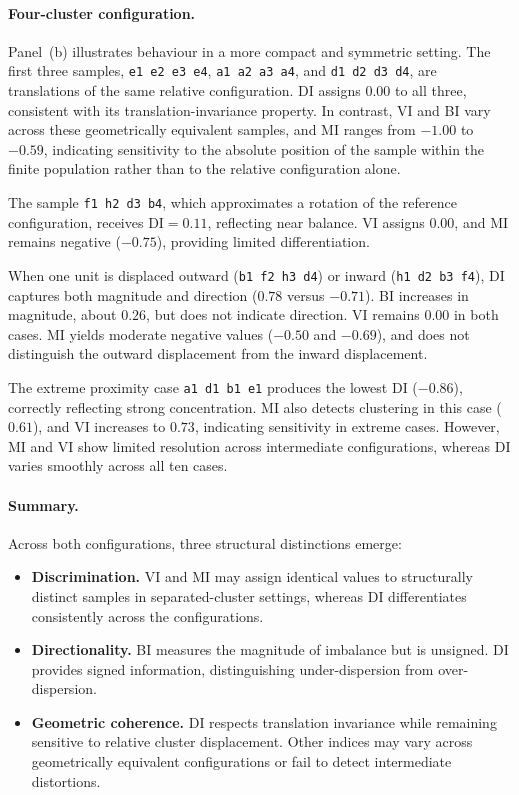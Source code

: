 \documentclass[12pt]{imsart}
\theoremstyle{plain}
\theoremstyle{remark}
\begin{document}
\paragraph{Four-cluster configuration.}

Panel~(b) illustrates behaviour in a more compact and symmetric setting. The
first three samples,
\texttt{e1 e2 e3 e4}, \texttt{a1 a2 a3 a4}, and \texttt{d1 d2 d3 d4},
are translations of the same relative configuration. DI assigns \(0.00\) to
all three, consistent with its translation-invariance property. In contrast,
VI and BI vary across these geometrically equivalent samples, and MI ranges
from \(-1.00\) to \(-0.59\), indicating sensitivity to the absolute position
of the sample within the finite population rather than to the relative
configuration alone.

The sample \texttt{f1 h2 d3 b4}, which approximates a rotation of the
reference configuration, receives \(\mathrm{DI}=0.11\), reflecting near
balance. VI assigns \(0.00\), and MI remains negative (\(-0.75\)), providing
limited differentiation.

When one unit is displaced outward (\texttt{b1 f2 h3 d4}) or inward
(\texttt{h1 d2 b3 f4}), DI captures both magnitude and direction
(\(0.78\) versus \(-0.71\)). BI increases in magnitude, about \(0.26\), but
does not indicate direction. VI remains \(0.00\) in both cases. MI yields
moderate negative values (\(-0.50\) and \(-0.69\)), and does not distinguish
the outward displacement from the inward displacement.

The extreme proximity case \texttt{a1 d1 b1 e1} produces the lowest DI
(\(-0.86\)), correctly reflecting strong concentration. MI also detects
clustering in this case (\(0.61\)), and VI increases to \(0.73\), indicating
sensitivity in extreme cases. However, MI and VI show limited resolution
across intermediate configurations, whereas DI varies smoothly across all ten
cases.

\paragraph{Summary.}

Across both configurations, three structural distinctions emerge:
\begin{itemize}
\item \textbf{Discrimination.} VI and MI may assign identical values to
structurally distinct samples in separated-cluster settings, whereas DI
differentiates consistently across the configurations.

\item \textbf{Directionality.} BI measures the magnitude of imbalance but is
unsigned. DI provides signed information, distinguishing under-dispersion from
over-dispersion.

\item \textbf{Geometric coherence.} DI respects translation invariance while
remaining sensitive to relative cluster displacement. Other indices may vary
across geometrically equivalent configurations or fail to detect intermediate
distortions.
\end{itemize}
\end{document}
